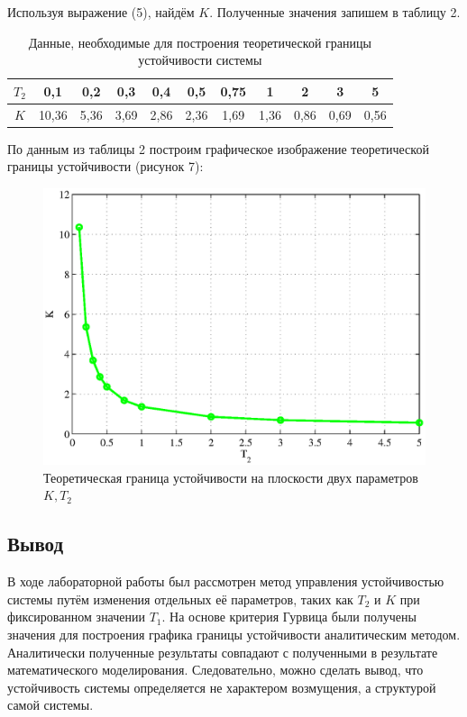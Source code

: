 \documentclass[a4paper,12pt]{article} %
\begin{document}
Используя выражение (5), найдём $K$. Полученные значения запишем в таблицу 2.
\begin{table}[h!]
	\caption{Данные, необходимые для построения теоретической границы устойчивости системы}
	\renewcommand{\arraystretch}{1.8} %
	\begin{center}
		\begin{tabular}{|c|c|c|c|c|c|c|c|c|c|c|}
			\hline $T_2$ & 0,1 & 0,2 & 0,3 & 0,4 & 0,5 & 0,75 & 1 & 2 & 3 & 5\\
			\hline $K$ & 10,36 & 5,36 & 3,69 & 2,86 & 2,36 & 1,69 & 1,36 & 0,86 & 0,69 & 0,56\\
			\hline
		\end{tabular}	
	\end{center}
\end{table}  
 
По данным из таблицы 2 построим графическое изображение теоретической границы устойчивости (рисунок 7):
\begin{figure}[H]
	\centering
	\includegraphics[width=1\linewidth]{scheme/plot4.eps}
	\caption{Теоретическая граница устойчивости на плоскости двух параметров $K, T_2$}
\end{figure}

\newpage
\begin{center}
	\section*{Вывод}
\end{center}
\par
В ходе лабораторной работы был рассмотрен метод управления устойчивостью системы путём изменения отдельных её параметров, таких как  $T_2$ и $K$ при фиксированном значении $T_1$. На основе критерия Гурвица были получены значения для построения графика границы устойчивости аналитическим методом. Аналитически полученные результаты совпадают с полученными в результате математического моделирования. Следовательно, можно сделать вывод, что устойчивость системы определяется не характером возмущения, а структурой самой системы.
\end{document}
